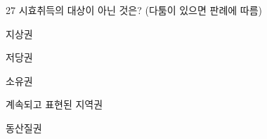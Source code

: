 \begin{question}{27}
시효취득의 대상이 아닌 것은? (다툼이 있으면 판례에 따름)
\begin{choices}
  \item 지상권
  \item 저당권
  \item 소유권
  \item 계속되고 표현된 지역권
  \item 동산질권
\end{choices}
\end{question}
